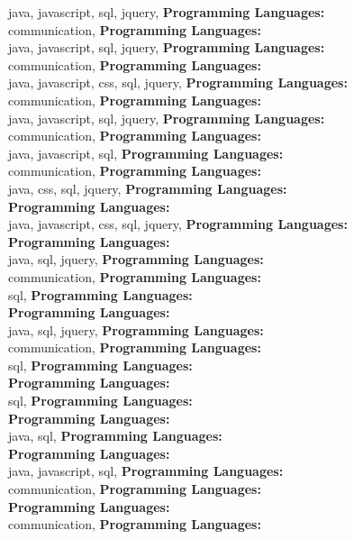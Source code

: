 java, javascript, sql, jquery, \textbf{Programming Languages:} \\
communication, \textbf{Programming Languages:} \\
java, javascript, sql, jquery, \textbf{Programming Languages:} \\
communication, \textbf{Programming Languages:} \\
java, javascript, css, sql, jquery, \textbf{Programming Languages:} \\
communication, \textbf{Programming Languages:} \\
java, javascript, sql, jquery, \textbf{Programming Languages:} \\
communication, \textbf{Programming Languages:} \\
java, javascript, sql, \textbf{Programming Languages:} \\
communication, \textbf{Programming Languages:} \\
java, css, sql, jquery, \textbf{Programming Languages:} \\
\textbf{Programming Languages:} \\
java, javascript, css, sql, jquery, \textbf{Programming Languages:} \\
\textbf{Programming Languages:} \\
java, sql, jquery, \textbf{Programming Languages:} \\
communication, \textbf{Programming Languages:} \\
sql, \textbf{Programming Languages:} \\
\textbf{Programming Languages:} \\
java, sql, jquery, \textbf{Programming Languages:} \\
communication, \textbf{Programming Languages:} \\
sql, \textbf{Programming Languages:} \\
\textbf{Programming Languages:} \\
sql, \textbf{Programming Languages:} \\
\textbf{Programming Languages:} \\
java, sql, \textbf{Programming Languages:} \\
\textbf{Programming Languages:} \\
java, javascript, sql, \textbf{Programming Languages:} \\
communication, \textbf{Programming Languages:} \\
\textbf{Programming Languages:} \\
communication, \textbf{Programming Languages:} \\
